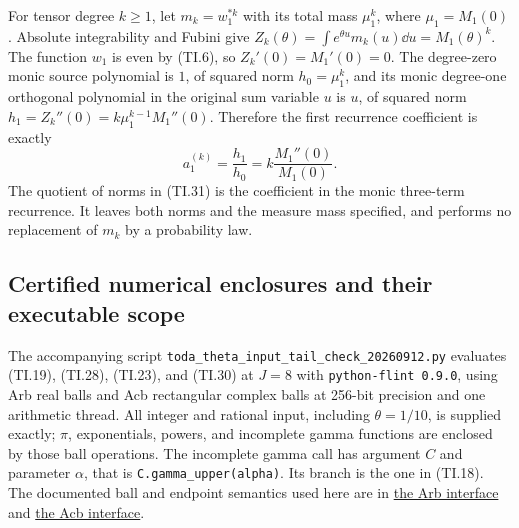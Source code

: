 For tensor degree $k\ge1$, let $m_k=w_1^{*k}$ with its total mass
$\mu_1^k$, where $\mu_1=M_1(0)$. Absolute integrability and Fubini give
$Z_k(\theta)=\int e^{\theta u}m_k(u)\dd u=M_1(\theta)^k$.
The function $w_1$ is even by (TI.6), so $Z_k'(0)=M_1'(0)=0$.
The degree-zero monic source polynomial is $1$, of squared norm
$h_0=\mu_1^k$, and its monic degree-one orthogonal polynomial in
the original sum variable $u$ is $u$, of squared norm
$h_1=Z_k''(0)=k\mu_1^{k-1}M_1''(0)$. Therefore the first recurrence
coefficient is exactly
\begin{equation}
 a_1^{(k)}=\frac{h_1}{h_0}
 =k\frac{M_1''(0)}{M_1(0)}. \tag{TI.31}
\end{equation}
The quotient of norms in (TI.31) is the coefficient in the monic
three-term recurrence. It leaves both norms and the measure mass
specified, and performs no replacement of $m_k$ by a probability law.

\subsection{Certified numerical enclosures and their executable scope}

The accompanying script
\texttt{toda\_theta\_input\_tail\_check\_20260912.py} evaluates
(TI.19), (TI.28), (TI.23), and (TI.30) at $J=8$ with
\texttt{python-flint 0.9.0}, using Arb real balls and Acb rectangular
complex balls at 256-bit precision and one arithmetic thread.
All integer and rational input, including $\theta=1/10$, is supplied
exactly; $\pi$, exponentials, powers, and incomplete gamma functions
are enclosed by those ball operations. The incomplete gamma call has
argument $C$ and parameter $\alpha$, that is
\texttt{C.gamma\_upper(alpha)}. Its branch is the one in (TI.18).
The documented ball and endpoint semantics used here are in
\href{https://python-flint.readthedocs.io/en/latest/arb.html}{the Arb interface}
and
\href{https://python-flint.readthedocs.io/en/latest/acb.html}{the Acb interface}.


